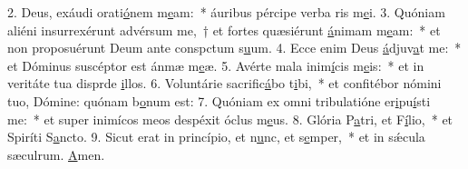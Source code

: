2. Deus, exáudi orati\uline{ó}nem m\uline{e}am:~* áuribus pércipe verba ris m\uline{e}i.
3. Quóniam aliéni insurrexérunt advérsum me,~† et fortes quæsiérunt \uline{á}nimam m\uline{e}am:~* et non proposuérunt Deum ante conspctum s\uline{u}um.
4. Ecce enim Deus \uline{á}djuv\uline{a}t me:~* et Dóminus suscéptor est ánmæ m\uline{e}æ.
5. Avérte mala inim\uline{í}cis m\uline{e}is:~* et in veritáte tua disprde \uline{i}llos.
6. Voluntárie sacrific\uline{á}bo t\uline{i}bi,~* et confitébor nómini tuo, Dómine: quónam b\uline{o}num est:
7. Quóniam ex omni tribulatióne er\uline{i}pu\uline{í}sti me:~* et super inimícos meos despéxit óclus m\uline{e}us.
8. Glória P\uline{a}tri, et F\uline{í}lio,~* et Spiríti S\uline{a}ncto.
9. Sicut erat in princípio, et n\uline{u}nc, et s\uline{e}mper,~* et in sǽcula sæculrum. \uline{A}men.
